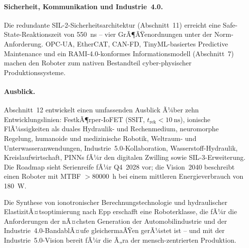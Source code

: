﻿\documentclass[a4paper,12pt]{scrreprt}
\theoremstyle{definition}
\begin{document}
\paragraph{Sicherheit, Kommunikation und Industrie~4.0.}
Die redundante SIL-2-Sicherheits\-architektur (Abschnitt~11) erreicht
eine Safe-State-Reaktionszeit von \SI{550}{\nano\second} -- vier
GrÃ¶ÃŸenordnungen unter der Norm-Anforderung. OPC-UA, EtherCAT, CAN-FD,
TinyML-basiertes Predictive Maintenance und ein RAMI-4.0-konformes
Informationsmodell (Abschnitt~7) machen den Roboter zum nativen
Bestandteil cyber-physischer Produktionssysteme.

\paragraph{Ausblick.}
Abschnitt~12 entwickelt einen umfassenden Ausblick Ã¼ber zehn
Entwicklungslinien: FestkÃ¶rper-IoFET (SSIT, $t_{\text{rek}} <
\SI{10}{\nano\second}$), ionische FlÃ¼ssigkeiten als duales
Hydraulik- und Rechenmedium, neuromorphe Regelung, humanoide und
medizinische Robotik, Weltraum- und Unterwasseranwendungen,
Industrie~5.0-Kollaboration, Wasserstoff-Hydraulik, Kreislaufwirtschaft,
PINNs fÃ¼r den digitalen Zwilling sowie SIL-3-Erweiterung.
Die Roadmap sieht Serienreife fÃ¼r Q4~2028 vor; die Vision~2040
beschreibt einen Roboter mit MTBF $>$\SI{80000}{\hour} bei einem
mittleren Energieverbrauch von \SI{180}{\watt}.

\medskip
Die Synthese von ionotronischer Berechnungstechnologie und
hydraulischer ElastizitÃ¤tsoptimierung nach Epp erschafft eine
Roboterklasse, die fÃ¼r die Anforderungen der nÃ¤chsten Generation
der Automobilindustrie und der Industrie~4.0-BandablÃ¤ufe
gleichermaÃŸen gerÃ¼stet ist -- und mit der Industrie~5.0-Vision
bereit fÃ¼r die Ã„ra der mensch-zentrierten Produktion.
\end{document}
